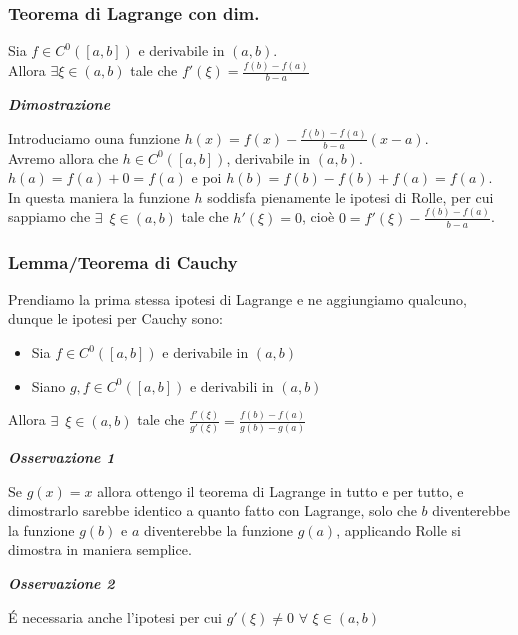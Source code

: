 \documentclass{article}
\theoremstyle{definition}
\begin{document}
\subsubsection{Teorema di Lagrange con dim.}
Sia $f \in C^0 ([a,b])$ e derivabile in $(a,b)$.
\\
Allora $\exists \xi \in (a,b)$ tale che $f'(\xi)=\frac{f(b)-f(a)}{b-a}$
\begin{center}
    \textbf{\textit{Dimostrazione}}
\end{center}
Introduciamo ouna funzione $h(x)=f(x)-\frac{f(b)-f(a)}{b-a}(x-a)$.
\\
Avremo allora che $h \in C^0([a,b])$, derivabile in $(a,b)$.
\\
$h(a)=f(a)+0=f(a)$ e poi $h(b)=f(b)-f(b)+f(a)=f(a)$.
\\
In questa maniera la funzione $h$ soddisfa pienamente le ipotesi di Rolle, per cui sappiamo che $\exists \,\,\, \xi \in (a,b)$ tale che $h'(\xi)=0$, cioè $0=f'(\xi)-\frac{f(b)-f(a)}{b-a}$.



















\subsubsection{Lemma/Teorema di Cauchy}
Prendiamo la prima stessa ipotesi di Lagrange e ne aggiungiamo qualcuno, dunque le ipotesi per Cauchy sono:
\begin{itemize}
    \item Sia $f \in C^0([a,b])$ e derivabile in $(a,b)$
    \item Siano $g,f \in C^0([a,b])$ e derivabili in $(a,b)$
\end{itemize}
Allora $\exists \,\,\, \xi \in (a,b)$ tale che $\frac{f'(\xi)}{g'(\xi)}=\frac{f(b)-f(a)}{g(b)-g(a)}$
\begin{center}
    \textbf{\textit{Osservazione 1}}
\end{center}
Se $g(x)=x$ allora ottengo il teorema di Lagrange in tutto e per tutto, e dimostrarlo sarebbe identico a quanto fatto con Lagrange, solo che $b$ diventerebbe la funzione $g(b)$ e $a$ diventerebbe la funzione $g(a)$, applicando Rolle si dimostra in maniera semplice.
\begin{center}
    \textbf{\textit{Osservazione 2}}
\end{center}
\'E necessaria anche l'ipotesi per cui $g'(\xi) \neq 0 \,\, \forall \,\, \xi \in (a,b)$
\end{document}
